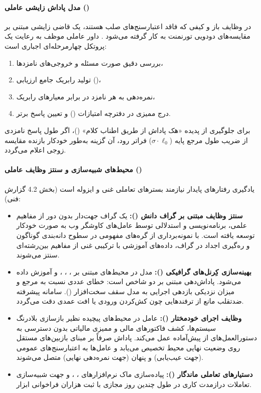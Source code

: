 \paragraph*{مدل پاداش زایشی عاملی ()}
در وظایف باز و کیفی که فاقد اعتبارسنج‌های صلب هستند، یک قاضی زایشی مبتنی بر مقایسه‌های دودویی تورنمنت به کار گرفته می‌شود \cite{kimi2025k2, kimi2026k25}. داور عاملی موظف به رعایت یک پروتکل چهارمرحله‌ای اجباری است:
\begin{enumerate}
    \item بررسی دقیق صورت مسئله و خروجی‌های نامزدها،
    \item تولید رابریک جامع ارزیابی ()،
    \item نمره‌دهی به هر نامزد در برابر معیارهای رابریک،
    \item درج ممیزی در دفترچه امتیازات () و تعیین پاسخ برتر.
\end{enumerate}
برای جلوگیری از پدیده «هک پاداش از طریق اطناب کلام» ()، اگر طول پاسخ نامزدی از ضریب طول مرجع پایه ($\sigma \cdot \ell_0$) فراتر رود، آن گزینه به‌طور خودکار بازنده مقایسه زوجی اعلام می‌گردد.

\paragraph*{محیط‌های شبیه‌سازی و سنتز وظایف عاملی ()}
یادگیری رفتارهای پایدار نیازمند بسترهای تعاملی غنی و ایزوله است (بخش 4.2 گزارش فنی):
\begin{itemize}
    \item \textbf{سنتز وظایف مبتنی بر گراف دانش ():} یک گراف جهت‌دار بدون دور از مفاهیم علمی، برنامه‌نویسی و استدلالی توسط عامل‌های کاوشگر وب به صورت خودکار توسعه یافته است. با نمونه‌برداری از گره‌های مفهومی در سطوح دانه‌بندی گوناگون و ره‌گیری اجداد در گراف، داده‌های آموزشی با ترکیبی غنی از مفاهیم بین‌رشته‌ای سنتز می‌شوند.
    \item \textbf{بهینه‌سازی کِرنل‌های گرافیکی ():} مدل در محیط‌های مبتنی بر ، ، ،  \cite{spector2025thunderkittens} و  \cite{wang2025tilelang} آموزش داده می‌شود. پاداش‌دهی مبتنی بر دو شاخص است: خطای عددی نسبت به مرجع  و میزان نزدیکی بازدهی اجرایی به مدل سقف سخت‌افزار (). سامانه پیشرفته ضدتقلب مانع از ترفندهایی چون کش‌کردن ورودی یا افت عمدی دقت می‌گردد.
    \item \textbf{وظایف اجرای خودمختار ():} عامل در محیط‌های پیچیده نظیر بازسازی بلادرنگ سیستم‌ها، کشف فاکتورهای مالی و ممیزی مالیاتی بدون دسترسی به دستورالعمل‌های از پیش‌آماده عمل می‌کند. پاداش صرفاً بر مبنای بازبین‌های مستقل روی وضعیت نهایی محیط تخصیص می‌یابد و عامل‌ها به اعتبارسنج‌های عمومی (جهت عیب‌یابی) و پنهان (جهت نمره‌دهی نهایی) متصل می‌شوند.
    \item \textbf{دستیارهای تعاملی ماندگار ():} پیاده‌سازی ماک نرم‌افزارهای ، ،  و  جهت شبیه‌سازی تعاملات درازمدت کاری در طول چندین روز مجازی با ثبت هزاران فراخوانی ابزار.
\end{itemize}

